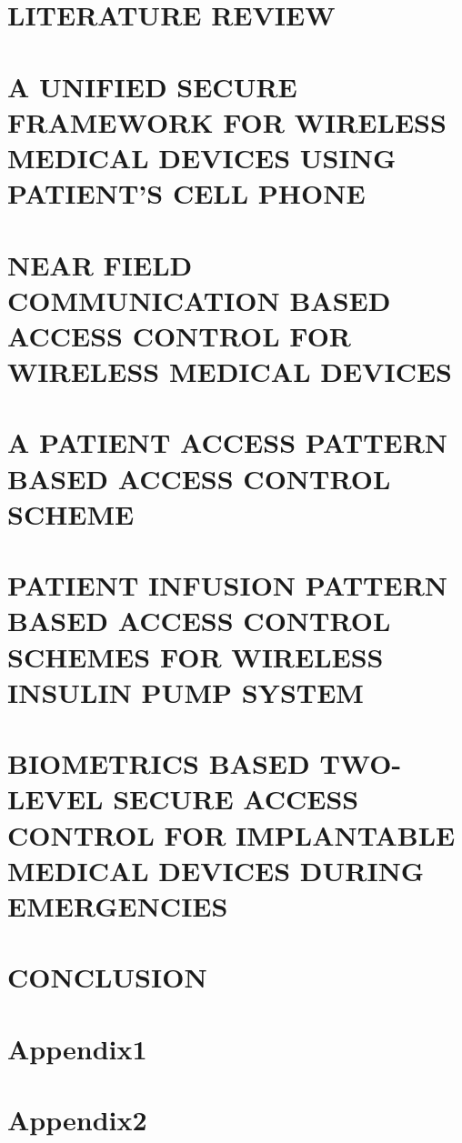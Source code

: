 \documentclass[reqno,12pt,oneside]{report} %
\begin{document}
\chapter{LITERATURE REVIEW}
 \label{chap:2}
 

\chapter{A UNIFIED SECURE FRAMEWORK FOR WIRELESS MEDICAL DEVICES USING PATIENT'S CELL PHONE}
 \label{chap:3}
 

\chapter{NEAR FIELD COMMUNICATION BASED ACCESS CONTROL FOR WIRELESS MEDICAL DEVICES}
 \label{chap:4}
 

\chapter{A PATIENT ACCESS PATTERN BASED ACCESS CONTROL SCHEME}
 \label{chap:5}
 

\chapter{PATIENT INFUSION PATTERN BASED ACCESS CONTROL SCHEMES FOR WIRELESS INSULIN PUMP SYSTEM}
 \label{chap:6}
 

\chapter{BIOMETRICS BASED TWO-LEVEL SECURE ACCESS CONTROL FOR IMPLANTABLE MEDICAL DEVICES DURING EMERGENCIES}
 \label{chap:7}
 

\chapter{CONCLUSION}
 \label{chap:8}
 


\startbibliography
 \begin{singlespace} %
  
  
 \end{singlespace}

 \startappendices
 \chapter{Appendix1}
 \label{Appendix:A}
 
 
  \chapter{Appendix2}
 \label{Appendix:B}
 
\end{document}
